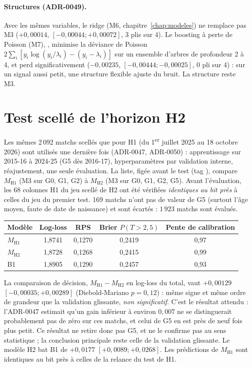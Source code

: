 \paragraph{Structures (ADR-0049).} Avec les mêmes variables, le ridge (M6, chapitre~\ref{chap:modeles})
ne remplace pas M3 (\(+0{,}00014\), \([-0{,}00044 ; +0{,}00072]\), 3 plis sur 4). Le boosting à perte de
Poisson (M7), , minimise la déviance de Poisson
\(2\sum_i [y_i \log(y_i/\lambda_i) - (y_i - \lambda_i)]\) sur un ensemble d'arbres de profondeur 2 à 4, et
perd significativement (\(-0{,}00235\), \([-0{,}00444 ; -0{,}00025]\), 0 pli sur 4) : sur un signal aussi
petit, une structure flexible ajuste du bruit. La structure reste M3.

\section{Test scellé de l'horizon H2}
\label{sec:test-scelle-h2}

Les mêmes 2\,092 matchs scellés que pour H1 (du 1\textsuperscript{er} juillet 2025 au 18 octobre 2026) sont
utilisés une dernière fois (ADR-0047, ADR-0050) : apprentissage sur 2015-16 à 2024-25 (G5 dès 2016-17),
hyperparamètres par validation interne, réajustement, une seule évaluation. La liste, figée avant le test
(tag ), compare \(M_{\mathrm{H1}}\) (M3 sur G0, G1, G2) à \(M_{\mathrm{H2}}\) (M3 sur
G0, G1, G2, G5). Avant l'évaluation, les 68 colonnes H1 du jeu scellé de H2 ont été vérifiées
\emph{identiques au bit près} à celles du jeu du premier test. 169 matchs n'ont pas de valeur de G5
(surtout l'âge moyen, faute de date de naissance) et sont écartés : \(1\,923\) matchs sont évalués.

\begin{center}
\begin{tabular}{lcccc}
\toprule
Modèle & Log-loss & RPS & Brier \(P(T > 2{,}5)\) & Pente de calibration \\
\midrule
\(M_{\mathrm{H1}}\) & 1,8741 & 0,1270 & 0,2419 & 0,97 \\
\(M_{\mathrm{H2}}\) & 1,8728 & 0,1268 & 0,2415 & 0,99 \\
B1 & 1,8905 & 0,1290 & 0,2457 & 0,93 \\
\bottomrule
\end{tabular}
\end{center}

La comparaison de décision, \(M_{\mathrm{H1}} - M_{\mathrm{H2}}\) en log-loss du total, vaut
\(+0{,}00129\) \([-0{,}00035 ; +0{,}00289]\) (Diebold-Mariano \(p = 0{,}12\)) : même signe et même ordre de
grandeur que la validation glissante, \emph{non significatif}. C'est le résultat attendu : l'ADR-0047
estimait qu'un gain inférieur à environ \(0{,}007\) ne se distinguerait probablement pas de zéro sur ces
matchs, et celui de G5 en est près de neuf fois plus petit. Ce résultat ne retire donc pas G5, et ne le
confirme pas au sens statistique ; la conclusion principale reste celle de la validation glissante. Le
modèle H2 bat B1 de \(+0{,}0177\) \([+0{,}0089 ; +0{,}0268]\). Les prédictions de \(M_{\mathrm{H1}}\) sont
identiques au bit près à celles de la relance du test de H1.
